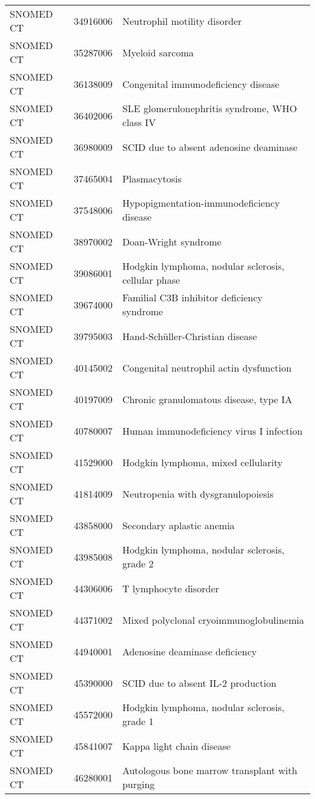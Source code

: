 \begin{table}[ht]
\begin{tabular}{lll}
  SNOMED CT & 34916006 & Neutrophil motility disorder \\ 
  SNOMED CT & 35287006 & Myeloid sarcoma \\ 
  SNOMED CT & 36138009 & Congenital immunodeficiency disease \\ 
  SNOMED CT & 36402006 & SLE glomerulonephritis syndrome, WHO class IV \\ 
  SNOMED CT & 36980009 & SCID due to absent adenosine deaminase \\ 
  SNOMED CT & 37465004 & Plasmacytosis \\ 
  SNOMED CT & 37548006 & Hypopigmentation-immunodeficiency disease \\ 
  SNOMED CT & 38970002 & Doan-Wright syndrome \\ 
  SNOMED CT & 39086001 & Hodgkin lymphoma, nodular sclerosis, cellular phase \\ 
  SNOMED CT & 39674000 & Familial C3B inhibitor deficiency syndrome \\ 
  SNOMED CT & 39795003 & Hand-Schüller-Christian disease \\ 
  SNOMED CT & 40145002 & Congenital neutrophil actin dysfunction \\ 
  SNOMED CT & 40197009 & Chronic granulomatous disease, type IA \\ 
  SNOMED CT & 40780007 & Human immunodeficiency virus I infection \\ 
  SNOMED CT & 41529000 & Hodgkin lymphoma, mixed cellularity \\ 
  SNOMED CT & 41814009 & Neutropenia with dysgranulopoiesis \\ 
  SNOMED CT & 43858000 & Secondary aplastic anemia \\ 
  SNOMED CT & 43985008 & Hodgkin lymphoma, nodular sclerosis, grade 2 \\ 
  SNOMED CT & 44306006 & T lymphocyte disorder \\ 
  SNOMED CT & 44371002 & Mixed polyclonal cryoimmunoglobulinemia \\ 
  SNOMED CT & 44940001 & Adenosine deaminase deficiency \\ 
  SNOMED CT & 45390000 & SCID due to absent IL-2 production \\ 
  SNOMED CT & 45572000 & Hodgkin lymphoma, nodular sclerosis, grade 1 \\ 
  SNOMED CT & 45841007 & Kappa light chain disease \\ 
  SNOMED CT & 46280001 & Autologous bone marrow transplant with purging \\ 

\end{tabular}
\end{table}
